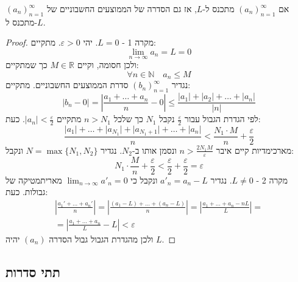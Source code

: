 \documentclass{tstextbook}
\begin{document}
\begin{theorem}[צ'סרו]
אם \((a_n)_{n=1}^\infty\) מתכנס ל-\(L\), אז גם הסדרה של הממוצעים החשבוניים של \((a_n)_{n=1}^\infty\) מתכנס ל-\(L\).

\end{theorem}
\begin{proof}
מקרה 1 - \(L=0\). יהי \(\varepsilon>0\). מתקיים:
$$\lim_{ n \to \infty } a_{n}=L=0$$
ולכן חסומה, וקיים \(M \in \mathbb{R}\) כך שמתקיים:
$$\forall n \in \mathbb{N}\quad a_{n}\leq M$$
נגדיר \((b_n)_{n=1}^\infty\) סדרת הממוצעים החשבוניים. מתקיים:
$$\lvert b_{n}-0 \rvert =\left\lvert   \frac{a_{1}+\dots+a_{n}}{n}-0  \right\rvert \leq \frac{\lvert a_{1} \rvert +\left\lvert  a_{2}  \right\rvert + \dots +\lvert a_{n} \rvert }{\lvert n \rvert }$$
לפי הגדרת הגבול עבור \(\frac{\varepsilon}{2}\) נקבל \(N_{1}\) כך שלכל \(n> N_{1}\) מתקיים \(\lvert a_{n} \rvert<\frac{\varepsilon}{2}\). כעת:
$$\frac{\lvert a_{1} \rvert +\dots+\lvert a_{N_{1}} \rvert +\lvert a_{N_{1}+1} \rvert +\dots+\lvert a_{n} \rvert}{n}< \frac{N_{1}\cdot M }{n}+\frac{\varepsilon}{2} $$
מארכימדיות קיים איבר \(n> \frac{2N_{1}M}{\varepsilon}\) ונסמן אותו ב-\(N_{2}\). נגדיר \(N=\max\{ N_{1},N_{2} \}\) ונקבל:
$$N_{1}\cdot \frac{M}{n}+\frac{\varepsilon}{2}<\frac{\varepsilon}{2}+\frac{\varepsilon}{2}=\varepsilon$$
מקרה 2 - \(L\neq 0\). נגדיר \(a'_{n}=a_{n}-L\) ונקבל כי \(\lim_{ n \to \infty }a'_{n}=0\) מאריתמטיקה של גבולות. כעת:
$$\begin{gather}\left\lvert  \frac{a_{1}'+\dots+a_{n}'}{n}  \right\rvert =\left\lvert  \frac{(a_{1}-L)+\dots+(a_{n}-L) }{n} \right\rvert =\left\lvert  \frac{a_{1}+\dots+a_{n}-nL}{L}  \right\rvert = \\=\left\lvert  \frac{a_{1}+\dots+a_{n}}{L}-L   \right\rvert   <\varepsilon
\end{gather}$$
ולכן מהגדרת הגבול גבול הסדרה \((a_{n})\) יהיה \(L\).

\end{proof}
\subsection{תתי סדרות}
\end{document}
